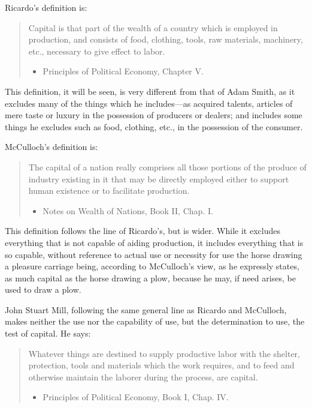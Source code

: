 Ricardo's definition is:

\begin{quote}
Capital is that part of the wealth of a country which is employed in
production, and consists of food, clothing, tools, raw materials,
machinery, etc., necessary to give effect to labor.

\begin{itemize}
\tightlist
\item
  Principles of Political Economy, Chapter V.
\end{itemize}
\end{quote}

This definition, it will be seen, is very different from that of Adam
Smith, as it excludes many of the things which he includes---as acquired
talents, articles of mere taste or luxury in the possession of producers
or dealers; and includes some things he excludes such as food, clothing,
etc., in the possession of the consumer.

McCulloch's definition is:

\begin{quote}
The capital of a nation really comprises all those portions of the
produce of industry existing in it that may be directly employed either
to support human existence or to facilitate production.

\begin{itemize}
\tightlist
\item
  Notes on Wealth of Nations, Book II, Chap. I.
\end{itemize}
\end{quote}

This definition follows the line of Ricardo's, but is wider. While it
excludes everything that is not capable of aiding production, it
includes everything that is so capable, without reference to actual use
or necessity for use the horse drawing a pleasure carriage being,
according to McCulloch's view, as he expressly states, as much capital
as the horse drawing a plow, because he may, if need arises, be used to
draw a plow.

John Stuart Mill, following the same general line as Ricardo and
McCulloch, makes neither the use nor the capability of use, but the
determination to use, the test of capital. He says:

\begin{quote}
Whatever things are destined to supply productive labor with the
shelter, protection, tools and materials which the work requires, and to
feed and otherwise maintain the laborer during the process, are capital.

\begin{itemize}
\tightlist
\item
  Principles of Political Economy, Book I, Chap. IV.
\end{itemize}
\end{quote}

